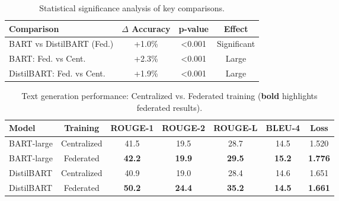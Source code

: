 \documentclass[conference]{IEEEtran}
\begin{document}
\begin{table}[H]
    \centering
    \caption{Statistical significance analysis of key comparisons.}
    \label{tab:statistical_analysis}
    \begin{tabular}{lccc}
        \hline
        Comparison & $\Delta$ Accuracy & p-value & Effect \\
        \hline
        BART vs DistilBART (Fed.) & +1.0\% & <0.001 & Significant \\
        BART: Fed. vs Cent. & +2.3\% & <0.001 & Large \\
        DistilBART: Fed. vs Cent. & +1.9\% & <0.001 & Large \\
        \hline
    \end{tabular}
\end{table}

\begin{table}[t]
    \centering
    \caption{Text generation performance: Centralized vs. Federated training (\textbf{bold} highlights federated results).}
    \label{tab:text_generation_performance}
    \begin{tabular}{lcccccc}
        \hline
        Model & Training & ROUGE-1 & ROUGE-2 & ROUGE-L & BLEU-4 & Loss \\
        \hline
        BART-large & Centralized & 41.5 & 19.5 & 28.7 & 14.5 & 1.520 \\
        BART-large & Federated   & \textbf{42.2} & \textbf{19.9} & \textbf{29.5} & \textbf{15.2} & \textbf{1.776} \\
        DistilBART & Centralized & 40.9 & 19.0 & 28.4 & 14.6 & 1.651 \\
        DistilBART & Federated   & \textbf{50.2} & \textbf{24.4} & \textbf{35.2} & \textbf{14.5} & \textbf{1.661} \\
        \hline
    \end{tabular}
\end{table}
\end{document}
